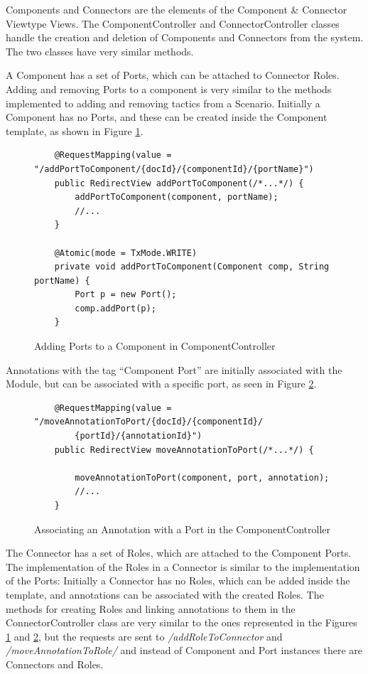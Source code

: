 \documentclass{llncs}
\begin{document}
Components and Connectors are the elements of the Component \& Connector Viewtype Views. The ComponentController and ConnectorController classes handle the creation and deletion of Components and Connectors from the system. The two classes have very similar methods.

A Component has a set of Ports, which can be attached to Connector Roles. Adding and removing Ports to a component is very similar to the methods implemented to adding and removing tactics from a Scenario. Initially a Component has no Ports, and these can be created inside the Component template, as shown in Figure \ref{figure:ComponentControllerAddingPorts}. 
\begin{figure}
\lstset{style=customjava}
\begin{lstlisting}
	@RequestMapping(value = "/addPortToComponent/{docId}/{componentId}/{portName}")
	public RedirectView addPortToComponent(/*...*/) {		
		addPortToComponent(component, portName);
		//...
	}

	@Atomic(mode = TxMode.WRITE)
	private void addPortToComponent(Component comp, String portName) {
		Port p = new Port();
		comp.addPort(p);
	}
\end{lstlisting}
\caption{Adding Ports to a Component in ComponentController}
\label{figure:ComponentControllerAddingPorts}
\end{figure}

Annotations with the tag ``Component Port'' are initially associated with the Module, but can be associated with a specific port, as seen in Figure \ref{figure:ComponentControllerLinkToPort}. 

\begin{figure}
\lstset{style=customjava}
\begin{lstlisting}
	@RequestMapping(value = "/moveAnnotationToPort/{docId}/{componentId}/
		{portId}/{annotationId}")
	public RedirectView moveAnnotationToPort(/*...*/) {
		
		moveAnnotationToPort(component, port, annotation);
		//...
	}	
\end{lstlisting}
\caption{Associating an Annotation with a Port in the ComponentController}
\label{figure:ComponentControllerLinkToPort}
\end{figure}

The Connector has a set of Roles, which are attached to the Component Ports. The implementation of the Roles in a Connector is similar to the implementation of the Ports: Initially a Connector has no Roles, which can be added inside the template, and annotations can be associated with the created Roles. The methods for creating Roles and linking annotations to them in the ConnectorController class are very similar to the ones represented in the Figures \ref{figure:ComponentControllerAddingPorts} and \ref{figure:ComponentControllerLinkToPort}, but the requests are sent to \textit{/addRoleToConnector} and \textit{/moveAnnotationToRole/} and instead of Component and Port instances there are Connectors and Roles.
\end{document}
